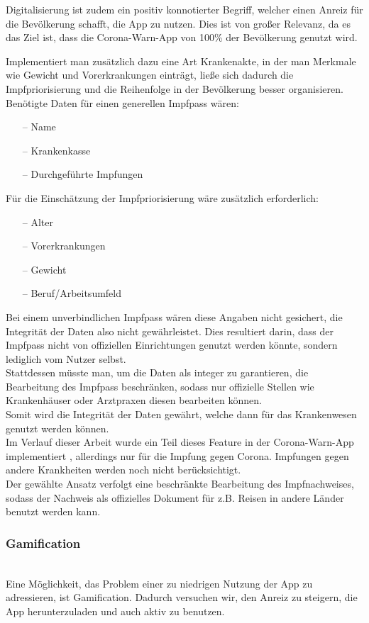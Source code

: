 \documentclass[conference,compsoc]{IEEEtran}
\begin{document}
Digitalisierung ist zudem ein positiv konnotierter Begriff, welcher einen Anreiz für die Bevölkerung schafft, die App zu nutzen. 
Dies ist von großer Relevanz, da es das Ziel ist, dass die Corona-Warn-App von 100\% der Bevölkerung genutzt wird.

Implementiert man zusätzlich dazu eine Art Krankenakte, in der man Merkmale wie Gewicht und Vorerkrankungen einträgt, ließe sich dadurch die Impfpriorisierung und die Reihenfolge in der Bevölkerung besser organisieren.
Benötigte Daten für einen generellen Impfpass wären:
\begin{itemize}
	\item[--]Name
	\item[--]Krankenkasse
	\item[--]Durchgeführte Impfungen
\end{itemize} 
Für die Einschätzung der Impfpriorisierung wäre zusätzlich erforderlich:
\begin{itemize}
	\item[--]Alter
	\item[--]Vorerkrankungen
	\item[--]Gewicht 
	\item[--]Beruf/Arbeitsumfeld
\end{itemize} 
Bei einem unverbindlichen Impfpass wären diese Angaben nicht gesichert, die Integrität der Daten also nicht gewährleistet. Dies resultiert darin, dass der Impfpass nicht von offiziellen Einrichtungen genutzt werden könnte, sondern lediglich vom Nutzer selbst.\\
Stattdessen müsste man, um die Daten als integer zu garantieren, die Bearbeitung des Impfpass beschränken, sodass nur offizielle Stellen wie Krankenhäuser oder Arztpraxen diesen bearbeiten können.\\
Somit wird die Integrität der Daten gewährt, welche dann für das Krankenwesen genutzt werden können.\\
Im Verlauf dieser Arbeit wurde ein Teil dieses Feature in der Corona-Warn-App implementiert \cite{Impfnachweis}, allerdings nur für die Impfung gegen Corona. Impfungen gegen andere Krankheiten werden noch nicht berücksichtigt.\\
Der gewählte Ansatz verfolgt eine beschränkte Bearbeitung des Impfnachweises, sodass der Nachweis als offizielles Dokument für z.B. Reisen in andere Länder benutzt werden kann.\\ 

\subsubsection{Gamification}
\text{}\\
Eine Möglichkeit, das Problem einer zu niedrigen Nutzung der App zu adressieren, ist Gamification. Dadurch versuchen wir, den Anreiz zu steigern, die App herunterzuladen und auch aktiv zu benutzen.
\end{document}

